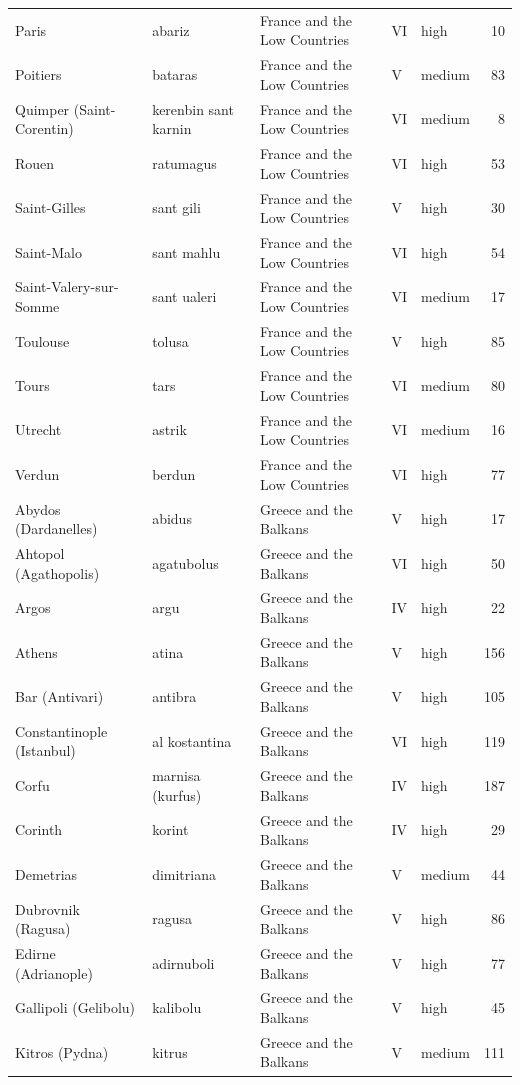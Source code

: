 \documentclass[11pt,a4paper]{article}
\begin{document}
{\begin{longtable}{p{4.6cm}p{3.0cm}p{3.6cm}llr}
Paris & abariz & France and the Low Countries & VI & high & 10\\
Poitiers & bataras & France and the Low Countries & V & medium & 83\\
Quimper (Saint-Corentin) & kerenbin sant karnin & France and the Low Countries & VI & medium & 8\\
Rouen & ratumagus & France and the Low Countries & VI & high & 53\\
Saint-Gilles & sant gili & France and the Low Countries & V & high & 30\\
Saint-Malo & sant mahlu & France and the Low Countries & VI & high & 54\\
Saint-Valery-sur-Somme & sant ualeri & France and the Low Countries & VI & medium & 17\\
Toulouse & tolusa & France and the Low Countries & V & high & 85\\
Tours & tars & France and the Low Countries & VI & medium & 80\\
Utrecht & astrik & France and the Low Countries & VI & medium & 16\\
Verdun & berdun & France and the Low Countries & VI & high & 77\\
Abydos (Dardanelles) & abidus & Greece and the Balkans & V & high & 17\\
Ahtopol (Agathopolis) & agatubolus & Greece and the Balkans & VI & high & 50\\
Argos & argu & Greece and the Balkans & IV & high & 22\\
Athens & atina & Greece and the Balkans & V & high & 156\\
Bar (Antivari) & antibra & Greece and the Balkans & V & high & 105\\
Constantinople (Istanbul) & al kostantina & Greece and the Balkans & VI & high & 119\\
Corfu & marnisa (kurfus) & Greece and the Balkans & IV & high & 187\\
Corinth & korint & Greece and the Balkans & IV & high & 29\\
Demetrias & dimitriana & Greece and the Balkans & V & medium & 44\\
Dubrovnik (Ragusa) & ragusa & Greece and the Balkans & V & high & 86\\
Edirne (Adrianople) & adirnuboli & Greece and the Balkans & V & high & 77\\
Gallipoli (Gelibolu) & kalibolu & Greece and the Balkans & V & high & 45\\
Kitros (Pydna) & kitrus & Greece and the Balkans & V & medium & 111\\

\end{longtable}}
\end{document}
